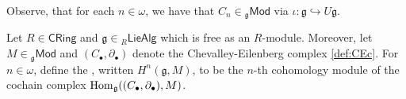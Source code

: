 Observe, that for each $n \in \omega$, we have that $C_n \in {_{\mathfrak{g}}}\mathsf{Mod}$ via $\iota : \mathfrak{g} \hookrightarrow U\mathfrak{g}$.

\begin{definition}
	Let $R \in \mathsf{CRing}$ and $\mathfrak{g} \in {_{R}}\mathsf{LieAlg}$ which is free as an $R$-module. Moreover, let $M \in {_{\mathfrak{g}}}\mathsf{Mod}$ and $(C_\bullet,\partial_\bullet)$ denote the Chevalley-Eilenberg complex \ref{def:CEc}. For $n \in \omega$, define the , written $H^n(\mathfrak{g},M)$, to be the $n$-th cohomology module of the cochain complex $\operatorname{Hom}_\mathfrak{g}((C_\bullet,\partial_\bullet),M)$.
\end{definition}

